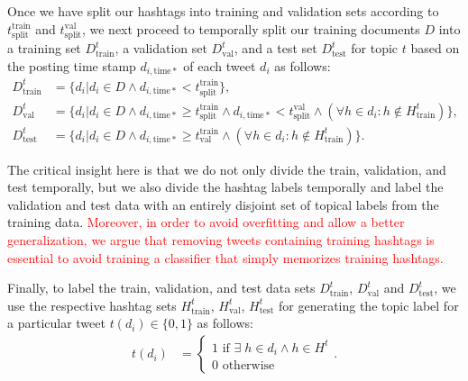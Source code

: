 Once we have split our hashtags into training and validation sets
according to $t^\mathrm{train}_\mathrm{split}$ and $t^\mathrm{val}_\mathrm{split}$, we next proceed to temporally split
our training documents $D$ into a training set $D^t_\mathrm{train}$, a validation set
$D^t_\mathrm{val}$, and a test set $D^t_\mathrm{test}$ for topic $t$ based on the posting
time stamp $d_{i,\mathrm{time*}}$ of each tweet $d_i$ as follows: 
\begin{align*}
D^t_\mathrm{train} & = \{ d_i | d_i \in D \land d_{i,\mathrm{time*}} <    t^\mathrm{train}_\mathrm{split} \} ,  \\
D^t_\mathrm{val}   & = \{ d_i | d_i \in D \land d_{i,\mathrm{time*}} \geq t^\mathrm{train}_\mathrm{split} \land  d_{i,\mathrm{time*}} <    t^\mathrm{val}_\mathrm{split} \land (\forall h \in d_i: h \notin H^t_\mathrm{train}) \} ,  \\
D^t_\mathrm{test}   & = \{ d_i | d_i \in D \land d_{i,\mathrm{time*}} \geq t^\mathrm{train}_\mathrm{val} \land (\forall h \in d_i: h \notin H^t_\mathrm{train}) \} .
\end{align*}


The critical insight here is that we do not only divide the train, validation, and test
temporally, but we also divide the hashtag labels temporally and label the validation and test
data with an entirely disjoint set of topical labels from the training data. \textcolor{red}{Moreover, in order to avoid overfitting and allow a better generalization, we argue that removing tweets containing training hashtags is essential to avoid training a classifier that simply memorizes training hashtags.}
 



Finally, to label the train, validation, and test data sets $D^t_\mathrm{train}$, $D^t_\mathrm{val}$ and $D^t_\mathrm{test}$, 
we use the respective
hashtag sets $H^t_\mathrm{train}$, $H^t_\mathrm{val}$, $H^t_\mathrm{test}$ for generating
the topic label for a particular tweet $t(d_{i}) \in \{0,1\}$ as follows:
\begin{align*}
t(d_{i}) & =
  \begin{cases}
    1 \textrm{ if }  \exists \; h \in d_i \land  h  \in H^t  \\
    0  \textrm{ otherwise}
  \end{cases} .
\end{align*}

